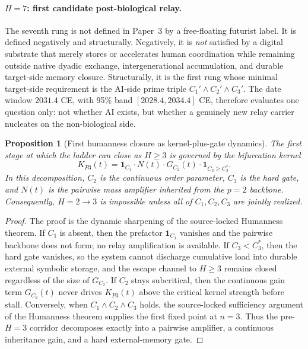 \documentclass[11pt]{article}
\newtheorem{proposition}{Proposition}
\begin{document}
\paragraph{$H{=}7$: first candidate post-biological relay.}
The seventh rung is not defined in Paper~3 by a free-floating futurist label.
It is defined negatively and structurally.
Negatively,
it is \emph{not} satisfied by a digital substrate that merely stores or
accelerates human coordination while remaining outside native dyadic exchange,
intergenerational accumulation,
and durable target-side memory closure.
Structurally,
it is the first rung whose minimal target-side requirement is the AI-side prime
triple
$C_1'\wedge C_2'\wedge C_3'$.
The date window
$2031.4$ CE,
with 95\% band
$[2028.4,2034.4]$ CE,
therefore evaluates one question only:
not whether AI exists,
but whether a genuinely new relay carrier nucleates on the non-biological side.

\begin{proposition}[First humanness closure as kernel-plus-gate dynamics]
\label{prop:S-LadderFull-KP3}
The first stage at which the ladder can close as
$H\ge 3$
is governed by the bifurcation kernel
\begin{equation}
K_{P3}(t)
=
\mathbf{1}_{C_1}
\cdot
N(t)
\cdot
G_{C_2}(t)
\cdot
\mathbf{1}_{C_3\ge C_3^{\ast}}.
\label{eq:S-LadderFull-KP3}
\end{equation}
In this decomposition,
$C_2$ is the continuous order parameter,
$C_3$ is the hard gate,
and
$N(t)$ is the pairwise mass amplifier inherited from the $p{=}2$ backbone.
Consequently,
$H{=}2\to 3$
is impossible unless all of
$C_1,C_2,C_3$
are jointly realized.
\end{proposition}

\begin{proof}
The proof is the dynamic sharpening of the source-locked Humanness theorem.
If $C_1$ is absent,
then the prefactor
$\mathbf{1}_{C_1}$
vanishes and the pairwise backbone does not form;
no relay amplification is available.
If $C_3<C_3^{\ast}$,
then the hard gate vanishes,
so the system cannot discharge cumulative load into durable external symbolic
storage,
and the escape channel to
$H\ge 3$
remains closed regardless of the size of
$G_{C_2}$.
If $C_2$ stays subcritical,
then the continuous gain term
$G_{C_2}(t)$
never drives
$K_{P3}(t)$
above the critical kernel strength before stall.
Conversely,
when
$C_1\wedge C_2\wedge C_3$
holds,
the source-locked sufficiency argument of the Humanness theorem supplies the
first fixed point at
$n{=}3$.
Thus the pre-$H{=}3$ corridor decomposes exactly into a pairwise amplifier,
a continuous inheritance gain,
and a hard external-memory gate.
\end{proof}
\end{document}
